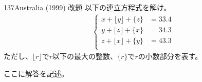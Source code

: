 \begin{thm}{137}{\maru}{Australia (1999) 改題}
 以下の連立方程式を解け。
 \begin{align*}
  \left\{
  \begin{aligned}
   x+\lfloor y \rfloor + \{z\} &= 33.4 \\
   y+\lfloor z \rfloor + \{x\} &= 34.3 \\
   z+\lfloor x \rfloor + \{y\} &= 43.3 \\
  \end{aligned}
  \right.
 \end{align*}
 ただし、$\lfloor r \rfloor$で$r$以下の最大の整数、$\{r\}$で$r$の小数部分を表す。
\end{thm}

ここに解答を記述。
